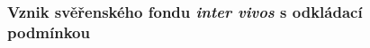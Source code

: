 \documentclass{article}
\begin{document}







\subsubsection[Vznik svěřenského fondu \textit{inter vivos} s odkládacé podmínkou]{Vznik svěřenského fondu \textit{inter vivos} s odkládací\\ podmínkou}



\end{document}
